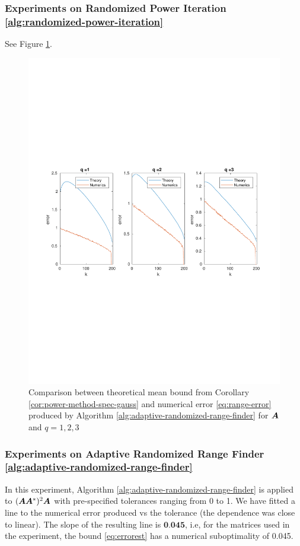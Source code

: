 \subsubsection{Experiments on Randomized Power Iteration 
\ref{alg:randomized-power-iteration}} See Figure \ref{fig:exp1-2}.
\begin{figure}[H] \label{fig:exp1-2}
\begin{center}
\includegraphics[width=\textwidth, trim=0cm 8cm 0cm 9cm, clip=true]{figures/1-5.pdf}
\end{center}
\caption{Comparison between theoretical mean bound from Corollary
\ref{cor:power-method-spec-gauss} and numerical
error \ref{eq:range-error} produced by Algorithm \ref{alg:adaptive-randomized-range-finder}
for $\bm{A}$ and $q=1,2,3$}
\end{figure}

\subsubsection{Experiments on Adaptive Randomized Range Finder
\ref{alg:adaptive-randomized-range-finder}}
In this experiment, Algorithm \ref{alg:adaptive-randomized-range-finder} is applied
to $(\bm{A}\bm{A}^*)^2\bm{A}$ with pre-specified tolerances ranging
from 0 to 1. We have fitted a line to the numerical
error produced vs the tolerance (the dependence was close to linear). The slope of the
resulting line
is $\textbf{0.045}$, i.e, for the matrices used in the experiment, the 
bound \ref{eq:errorest} has a numerical suboptimality of 0.045.
